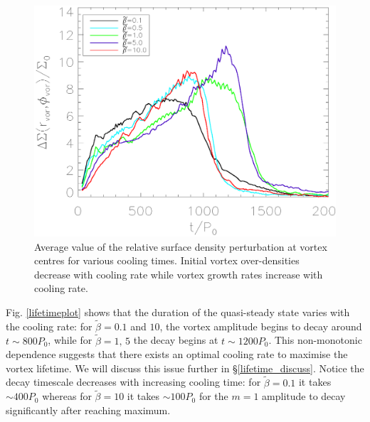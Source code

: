 \begin{figure}
  \includegraphics[width=\linewidth,clip=true,trim=0.5cm
  0cm 0cm 1cm]{figures/vortex_density}
  \caption{Average value of the relative surface density perturbation
    at vortex centres for various cooling
    times. Initial vortex over-densities decrease with cooling rate while
    vortex growth rates increase with cooling rate.
    \label{overdensity}}     
\end{figure}

Fig. \ref{lifetimeplot} shows that the duration of the quasi-steady state
varies with the cooling rate: for 
$\tilde{\beta}=0.1$ and $10$, the vortex amplitude begins to decay around
$t\sim800P_0$, while for $\tilde{\beta}=1,\,5$ the decay begins at 
$t\sim1200P_0$. This non-monotonic dependence suggests that there
exists an optimal cooling rate to maximise the vortex lifetime. We
will discuss this issue further in 
\S\ref{lifetime_discuss}. Notice the decay timescale decreases with
increasing cooling time: for $\tilde{\beta}=0.1$ it takes $\sim400P_0$
whereas for $\tilde{\beta}=10$ it takes $\sim 100P_0$ for the $m=1$
amplitude to decay significantly after reaching maximum. 






